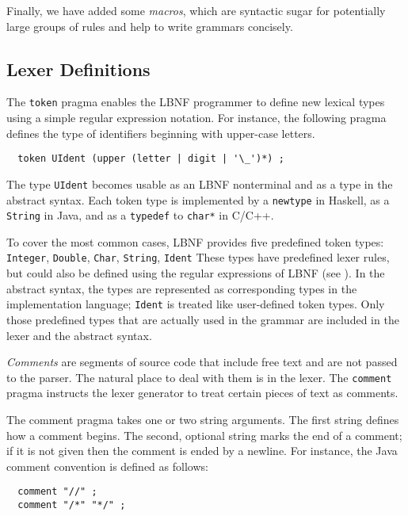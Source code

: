 Finally, we have added some {\em macros}, 
which are syntactic sugar for potentially 
large groups of rules and help to write grammars 
concisely.

\subsection{Lexer Definitions}
\label{lexer}


\label{reg}

The {\tt token} pragma enables the LBNF programmer
to define new lexical types using
a simple regular expression notation.
For instance, the following pragma defines the type of
identifiers beginning with upper-case letters.
\begin{verbatim}
  token UIdent (upper (letter | digit | '\_')*) ;
\end{verbatim}
The type {\tt UIdent} becomes usable
as an LBNF nonterminal and as a type in the abstract syntax.
Each token type is implemented by a {\tt newtype} in Haskell, as
a {\tt String} in Java, and as a {\tt typedef} to {\tt char*} in C/C++.



To cover the most common cases, LBNF provides
five predefined token types:
\bequ
{\tt Integer}, 
{\tt Double}, 
{\tt Char}, 
{\tt String}, 
{\tt Ident} 
\enqu
These types have predefined lexer rules, but could also be defined
using the regular expressions of LBNF (see \cite{bnfc}).
In the abstract syntax, the types are represented as corresponding
types in the implementation language; {\tt Ident} is treated like
user-defined token types.
Only those predefined types that are actually used in
the grammar are included in the lexer and the
abstract syntax. 


\textit{Comments} are segments of source code that include free
text and are not passed to the parser. The natural place
to deal with them is in the lexer. The {\tt comment} pragma instructs the
lexer generator to treat certain pieces of text as comments. 

The comment pragma takes one or two string arguments. The first
string defines how a comment begins.
The second, optional string marks the end of a comment;
if it is not given then the comment is ended by a newline.
For instance, the Java comment convention is defined as follows:
\begin{verbatim}
  comment "//" ;
  comment "/*" "*/" ; 
\end{verbatim}

